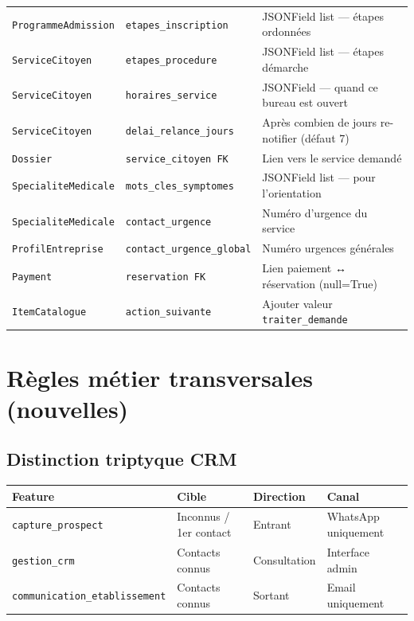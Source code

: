 \documentclass[11pt,a4paper]{article}
\newcommand{\slug}[1]{\texttt{\color{AGTDark}#1}}
\begin{document}
\begin{center}
\begin{tabularx}{\textwidth}{llX}
\slug{ProgrammeAdmission} & \slug{etapes\_inscription} & JSONField list — étapes ordonnées \\
\slug{ServiceCitoyen} & \slug{etapes\_procedure} & JSONField list — étapes démarche \\
\slug{ServiceCitoyen} & \slug{horaires\_service} & JSONField — quand ce bureau est ouvert \\
\slug{ServiceCitoyen} & \slug{delai\_relance\_jours} & Après combien de jours re-notifier (défaut 7) \\
\slug{Dossier} & \slug{service\_citoyen FK} & Lien vers le service demandé \\
\slug{SpecialiteMedicale} & \slug{mots\_cles\_symptomes} & JSONField list — pour l'orientation \\
\slug{SpecialiteMedicale} & \slug{contact\_urgence} & Numéro d'urgence du service \\
\slug{ProfilEntreprise} & \slug{contact\_urgence\_global} & Numéro urgences générales \\
\slug{Payment} & \slug{reservation FK} & Lien paiement ↔ réservation (null=True) \\
\slug{ItemCatalogue} & \slug{action\_suivante} & Ajouter valeur \texttt{traiter\_demande} \\
\bottomrule
\end{tabularx}
\end{center}

\section{Règles métier transversales (nouvelles)}

\subsection{Distinction triptyque CRM}

\begin{center}
\begin{tabularx}{\textwidth}{lllX}
\toprule
\textbf{Feature} & \textbf{Cible} & \textbf{Direction} & \textbf{Canal} \\
\midrule
\slug{capture\_prospect} & Inconnus / 1er contact & Entrant & WhatsApp uniquement \\
\slug{gestion\_crm} & Contacts connus & Consultation & Interface admin \\
\slug{communication\_etablissement} & Contacts connus & Sortant & Email uniquement \\
\bottomrule
\end{tabularx}
\end{center}
\end{document}
